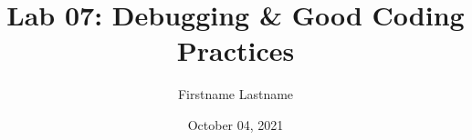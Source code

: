 \newcommand{\course}{MATH 3341}
\title{Lab 07: Debugging \& Good Coding Practices}
\author{Firstname Lastname}
\date{October 04, 2021}
